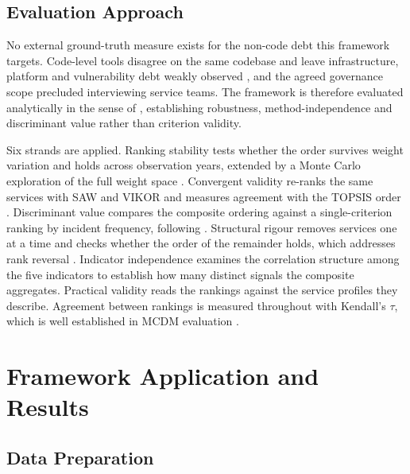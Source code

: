 \documentclass[
  authoryear,
  preprint]{elsarticle}
\begin{document}
\subsection{Evaluation Approach}\label{sec-evalapproach}

No external ground-truth measure exists for the non-code debt this
framework targets. Code-level tools disagree on the same codebase
\citep{amanatidisEvaluatingAgreementTechnical2020} and leave
infrastructure, platform and vulnerability debt weakly observed
\citep{biazottoTechnicalDebtManagement2024, albuquerqueManagingTechnicalDebt2023},
and the agreed governance scope precluded interviewing service teams.
The framework is therefore evaluated analytically in the sense of
\citet{hevnerDesignScienceInformation2004}, establishing robustness,
method-independence and discriminant value rather than criterion
validity.

Six strands are applied. Ranking stability tests whether the order
survives weight variation and holds across observation years, extended
by a Monte Carlo exploration of the full weight space
\citep{grecoMethodologicalFrameworkComposite2019}. Convergent validity
re-ranks the same services with SAW and VIKOR and measures agreement
with the TOPSIS order
\citep{ciardielloComparisonTOPSISSAW2023, shekhovtsovComparativeCaseStudy2020}.
Discriminant value compares the composite ordering against a
single-criterion ranking by incident frequency, following
\citet{albarakManagingTechnicalDebt2022}. Structural rigour removes
services one at a time and checks whether the order of the remainder
holds, which addresses rank reversal
\citep{garcia-cascalesRankReversalTOPSIS2012}. Indicator independence
examines the correlation structure among the five indicators to
establish how many distinct signals the composite aggregates. Practical
validity reads the rankings against the service profiles they describe.
Agreement between rankings is measured throughout with Kendall's
\(\tau\), which is well established in MCDM evaluation
\citep{shekhovtsovHowStronglyRank2021}.

\section{Framework Application and Results}\label{sec-results}

\subsection{Data Preparation}\label{data-preparation}
\end{document}

